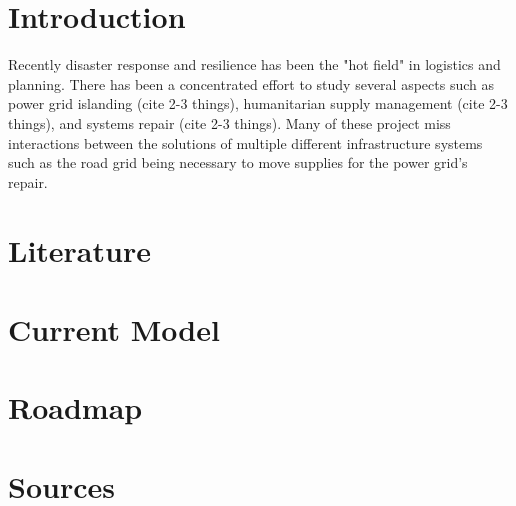 \documentclass{article}
\begin{document}
	\section{Introduction}
	Recently disaster response and resilience has been the "hot field" in logistics and planning. There has been a concentrated effort to study several aspects such as power grid islanding (cite 2-3 things), humanitarian supply management (cite 2-3 things), and systems repair (cite 2-3 things). Many of these project miss interactions between the solutions of multiple different infrastructure systems such as the road grid being necessary to move supplies for the power grid's repair. 
	\section{Literature}
	
	\section{Current Model}
	\section{Roadmap}
	\section{Sources}
\end{document}
